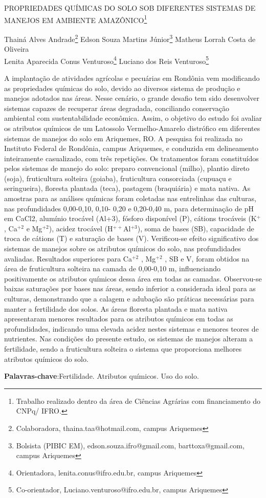 \documentclass[article,12pt,onesidea,4paper,english,brazil]{abntex2}
\begin{document}
	
	
	\frenchspacing 
	
	\begin{center}
		\LARGE PROPRIEDADES QUÍMICAS DO SOLO SOB DIFERENTES SISTEMAS DE MANEJOS EM AMBIENTE AMAZÔNICO\footnote{Trabalho realizado dentro da área de Ciências Agrárias com financiamento do CNPq/ IFRO.}
		
		\normalsize
		Thainá Alves Andrade\footnote{Colaboradora, thaina.taa@hotmail.com, campus Ariquemes} 
		Edson Souza Martins Júnior\footnote{Bolsista (PIBIC EM), edson.souza.ifro@gmail.com, barttoxa@gmail.com, campus Ariquemes} 
		Matheus Lorrah Costa de Oliveira \\
		Lenita Aparecida Conus Venturoso\footnote{Orientadora, lenita.conus@ifro.edu.br, campus Ariquemes} 
		Luciano dos Reis Venturoso\footnote{Co-orientador, Luciano.venturoso@ifro.edu.br, campus Ariquemes}
	\end{center}
	
	\noindent A implantação de atividades agrícolas e pecuárias em Rondônia vem modificando as
	propriedades químicas do solo, devido ao diversos sistema de produção e manejos
	adotados nas áreas. Nesse cenário, o grande desafio tem sido desenvolver sistemas
	capazes de recuperar áreas degradada, conciliando conservação ambiental com
	sustentabilidade econômica. Assim, o objetivo do estudo foi avaliar os atributos
	químicos de um Latossolo Vermelho-Amarelo distrófico em diferentes sistemas de
	manejos do solo em Ariquemes, RO. A pesquisa foi realizada no Instituto Federal de
	Rondônia, campus Ariquemes, e conduzida em delineamento inteiramente
	casualizado, com três repetições. Os tratamentos foram constituídos pelos sistemas
	de manejo do solo: preparo convencional (milho), plantio direto (soja), fruticultura
	solteira (goiaba), fruticultura consorciada (cupuaçu e seringueira), floresta plantada
	(teca), pastagem (braquiária) e mata nativa. As amostras para as análises químicas
	foram coletadas nas entrelinhas das culturas, nas profundidades 0,00-0,10, 0,10-
	0,20 e 0,20-0,40 m, para determinação de pH em CaCl2, alumínio trocável (Al+3),
	fósforo disponível (P), cátions trocáveis (K$^+$
	, Ca$^{+2}$ e Mg$^{+2}$), acidez trocável (H$^{++}$Al$^{+3}$),
	soma de bases (SB), capacidade de troca de cátions (T) e saturação de bases (V).
	Verificou-se efeito significativo dos sistemas de manejos sobre os atributos químicos
	do solo, nas profundidades avaliadas. Resultados superiores para Ca$^{+2}$
	, Mg$^{+2}$
	, SB e
	V, foram obtidos na área de fruticultura solteira na camada de 0,00-0,10 m,
	influenciando positivamente os atributos químicos dessa área em todas as camadas.
	Observou-se baixas saturações por bases nas áreas, sendo inferior a considerada
	ideal para as culturas, demonstrando que a calagem e adubação são práticas
	necessárias para manter a fertilidade dos solos. As áreas floresta plantada e mata
	nativa apresentaram menores resultados para os atributos químicos em todas as
	profundidades, indicando uma elevada acidez nestes sistemas e menores teores de
	nutrientes. Nas condições do presente estudo, os sistemas de manejos alteram a
	fertilidade, sendo a fruticultura solteira o sistema que proporciona melhores atributos
	químicos do solo.
	
	\vspace{\onelineskip}
	
	\noindent
	\textbf{Palavras-chave}:Fertilidade. Atributos químicos. Uso do solo.
	
\end{document}
